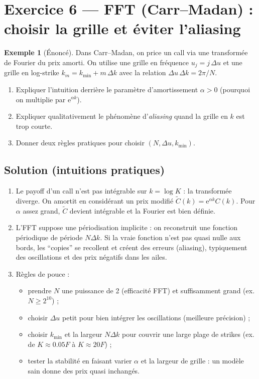 \documentclass[11pt,a4paper]{report}
\newcommand{\ee}{\mathrm{e}}
\newcommand{\1}{\mathbbm{1}}
\theoremstyle{definition}
\newtheorem{example}{Exemple}[chapter]
\theoremstyle{plain}
\theoremstyle{remark}
\begin{document}
\section{Exercice 6 --- FFT (Carr--Madan) : choisir la grille et éviter l'aliasing}
\begin{example}[Énoncé]
Dans Carr--Madan, on price un call via une transformée de Fourier du prix amorti.
On utilise une grille en fréquence $u_j=j\,\Delta u$ et une grille en log-strike $k_m=k_{\min}+m\,\Delta k$ avec la relation $\Delta u\,\Delta k=2\pi/N$.
\begin{enumerate}[label=\alph*)]
  \item Expliquer l'intuition derrière le paramètre d'amortissement $\alpha>0$ (pourquoi on multiplie par $\ee^{\alpha k}$).
  \item Expliquer qualitativement le phénomène d'\emph{aliasing} quand la grille en $k$ est trop courte.
  \item Donner deux règles pratiques pour choisir $(N,\Delta u,k_{\min})$.
\end{enumerate}
\end{example}

\subsection*{Solution (intuitions pratiques)}
\begin{enumerate}[label=\alph*)]
  \item Le payoff d'un call n'est pas intégrable sur $k=\log K$ : la transformée diverge.
  On amortit en considérant un prix modifié $\widetilde{C}(k)=\ee^{\alpha k}C(k)$.
  Pour $\alpha$ assez grand, $\widetilde{C}$ devient intégrable et la Fourier est bien définie.
  \item L'FFT suppose une périodisation implicite : on reconstruit une fonction périodique de période $N\Delta k$.
  Si la vraie fonction n'est pas quasi nulle aux bords, les ``copies'' se recollent et créent des erreurs (aliasing), typiquement des oscillations et des prix négatifs dans les ailes.
  \item Règles de pouce :
  \begin{itemize}
    \item prendre $N$ une puissance de 2 (efficacité FFT) et suffisamment grand (ex. $N\ge 2^{10}$) ;
    \item choisir $\Delta u$ petit pour bien intégrer les oscillations (meilleure précision) ;
    \item choisir $k_{\min}$ et la largeur $N\Delta k$ pour couvrir une large plage de strikes (ex. de $K\approx 0.05F$ à $K\approx 20F$) ;
    \item tester la stabilité en faisant varier $\alpha$ et la largeur de grille : un modèle sain donne des prix quasi inchangés.
  \end{itemize}
\end{enumerate}
\end{document}
